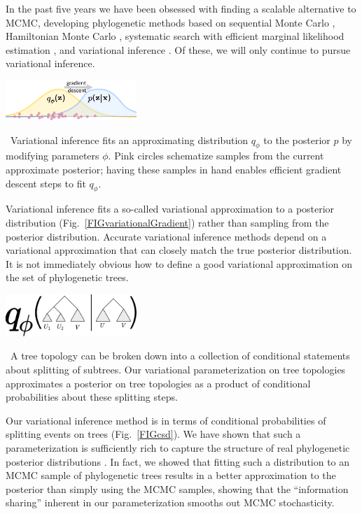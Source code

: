 \documentclass[nobib]{tufte-handout}
\begin{document}
In the past five years we have been obsessed with finding a scalable alternative to MCMC, developing phylogenetic methods based on
sequential Monte Carlo \cite{Dinh2017-sh,Fourment2017-an,Claywell2018-zg},
Hamiltonian Monte Carlo \cite{Dinh2017-oj},
systematic search \cite{Whidden2018-db} with efficient marginal likelihood estimation \cite{Fourment2018-xx},
and variational inference \cite{Zhang2018-lw,Zhang2018-mm}.
Of these, we will only continue to pursue variational inference.

\begin{marginfigure}[0.in]%
  \includegraphics[width=1.95in]{variational-gradient}
  \caption{\
    Variational inference fits an approximating distribution $q_\phi$ to the posterior $p$ by modifying parameters $\phi$.
    Pink circles schematize samples from the current approximate posterior; having these samples in hand enables efficient gradient descent steps to fit $q_\phi$.
    }
  \label{FIGvariationalGradient}
\end{marginfigure}%

Variational inference fits a so-called variational approximation to a posterior distribution (Fig.~\ref{FIGvariationalGradient}) rather than sampling from the posterior distribution.
Accurate variational inference methods depend on a variational approximation that can closely match the true posterior distribution.
It is not immediately obvious how to define a good variational approximation on the set of phylogenetic trees.

\begin{marginfigure}[0.7in]%
  \includegraphics[width=1.95in]{csd}
  \caption{\
    A tree topology can be broken down into a collection of conditional statements about splitting of subtrees.
    Our variational parameterization on tree topologies approximates a posterior on tree topologies as a product of conditional probabilities about these splitting steps.
    }
  \label{FIGcsd}
\end{marginfigure}%

Our variational inference method is in terms of conditional probabilities of splitting events on trees (Fig.~\ref{FIGcsd}).
We have shown that such a parameterization is sufficiently rich to capture the structure of real phylogenetic posterior distributions \cite{Zhang2018-mm}.
In fact, we showed that fitting such a distribution to an MCMC sample of phylogenetic trees results in a better approximation to the posterior than simply using the MCMC samples, showing that the ``information sharing'' inherent in our parameterization smooths out MCMC stochasticity.
\end{document}
